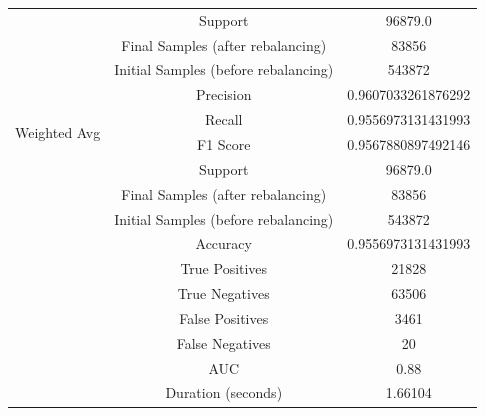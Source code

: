 \begin{longtable}{|c|c|c|}
 & Support & 96879.0 \\
 & Final Samples (after rebalancing) & 83856 \\
 & Initial Samples (before rebalancing) & 543872 \\
\hline
\multirow{4}{*}{Weighted Avg} & Precision & 0.9607033261876292 \\
 & Recall & 0.9556973131431993 \\
 & F1 Score & 0.9567880897492146 \\
 & Support & 96879.0 \\
 & Final Samples (after rebalancing) & 83856 \\
 & Initial Samples (before rebalancing) & 543872 \\
\hline
& Accuracy & 0.9556973131431993 \\ \hline
& True Positives & 21828 \\ \hline
& True Negatives & 63506 \\ \hline
& False Positives & 3461 \\ \hline
& False Negatives & 20 \\ \hline
& AUC & 0.88 \\ \hline
& Duration (seconds) & 1.66104 \\ \hline
\end{longtable}


